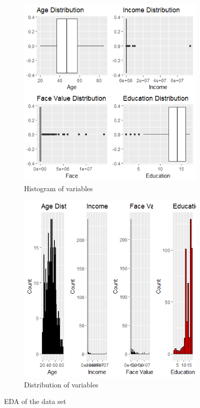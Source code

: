 \documentclass[12pt, twoside,hidelinks]{article}
\theoremstyle{definition}
\numberwithin{equation}{section}
\begin{document}
\begin{figure}[ht!]
    \centering
    \begin{subfigure}[b]{0.45\textwidth}
        \includegraphics[width=\textwidth]{visuals/InsuranceVisuals/UstermHist.png}
        \caption{Histogram of variables}
        \label{fig:hist_of_variables}
    \end{subfigure}
    \hfill
    \begin{subfigure}[b]{0.45\textwidth}
        \includegraphics[width=\textwidth]{visuals/InsuranceVisuals/UstermDist.png}
        \caption{Distribution of variables}
        \label{fig:Distribution_of_variables}
    \end{subfigure}
    \caption{EDA of the data set}
    \label{fig:test_data_performance_1}
\end{figure}
\end{document}
